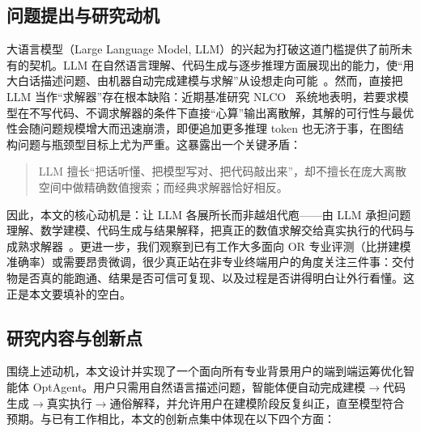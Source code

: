 \documentclass[11pt]{article}
\begin{document}
\subsection{问题提出与研究动机}
大语言模型（Large Language Model, LLM）的兴起为打破这道门槛提供了前所未有的契机。LLM 在自然语言理解、代码生成与逐步推理方面展现出的能力，使“用大白话描述问题、由机器自动完成建模与求解”从设想走向可能~\cite{li2023synthesizing,daros2026survey}。然而，直接把 LLM 当作“求解器”存在根本缺陷：近期基准研究 NLCO~\cite{jiang2025nlco} 系统地表明，若要求模型在不写代码、不调求解器的条件下直接“心算”输出离散解，其解的可行性与最优性会随问题规模增大而迅速崩溃，即便追加更多推理 token 也无济于事，在图结构问题与瓶颈型目标上尤为严重。这暴露出一个关键矛盾：

\begin{quote}
LLM 擅长“把话听懂、把模型写对、把代码敲出来”，却不擅长在庞大离散空间中做精确数值搜索；而经典求解器恰好相反。
\end{quote}

因此，本文的核心动机是：让 LLM 各展所长而非越俎代庖——由 LLM 承担问题理解、数学建模、代码生成与结果解释，把真正的数值求解交给真实执行的代码与成熟求解器~\cite{ahmaditeshnizi2024optimus,hu2025power,chen2025sirl}。更进一步，我们观察到已有工作大多面向 OR 专业评测（比拼建模准确率）或需要昂贵微调，很少真正站在非专业终端用户的角度关注三件事：交付物是否真的能跑通、结果是否可信可复现、以及过程是否讲得明白让外行看懂。这正是本文要填补的空白。

\subsection{研究内容与创新点}
围绕上述动机，本文设计并实现了一个面向所有专业背景用户的端到端运筹优化智能体 OptAgent。用户只需用自然语言描述问题，智能体便自动完成建模$\rightarrow$代码生成$\rightarrow$真实执行$\rightarrow$通俗解释，并允许用户在建模阶段反复纠正，直至模型符合预期。与已有工作相比，本文的创新点集中体现在以下四个方面：
\end{document}
